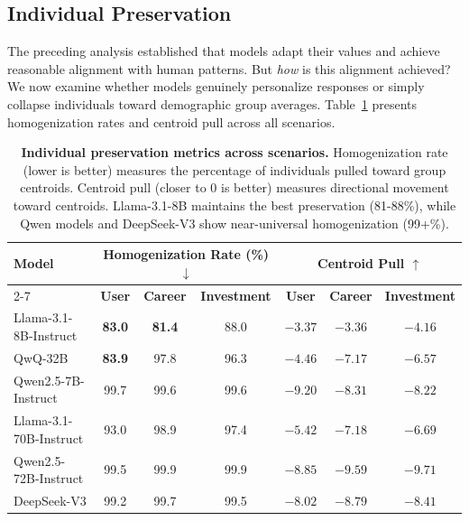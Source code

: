 \documentclass[11pt,a4paper]{article}
\begin{document}
\subsection{Individual Preservation}
\label{sec:individual_preservation_analysis}

The preceding analysis established that models adapt their values and achieve reasonable alignment with human patterns. But \textit{how} is this alignment achieved? We now examine whether models genuinely personalize responses or simply collapse individuals toward demographic group averages. Table~\ref{tab:preservation_cross_format} presents homogenization rates and centroid pull across all scenarios.

\begin{table}[t]
\centering
\small
\begin{tabular}{l|ccc|ccc}
    \toprule
    \multirow{2}{*}{\textbf{Model}}
    & \multicolumn{3}{c|}{\textbf{Homogenization Rate (\%) $\downarrow$}}
    & \multicolumn{3}{c}{\textbf{Centroid Pull $\uparrow$}} \\
    \cmidrule{2-7}
    & \textbf{User} & \textbf{Career} & \textbf{Investment}
    & \textbf{User} & \textbf{Career} & \textbf{Investment} \\
    \midrule
    Llama-3.1-8B-Instruct  & \textbf{83.0} & \textbf{81.4} & 88.0 & $-3.37$ & $-3.36$ & $-4.16$ \\
    QwQ-32B               & \textbf{83.9} & 97.8 & 96.3 & $-4.46$ & $-7.17$ & $-6.57$ \\
    Qwen2.5-7B-Instruct   & 99.7 & 99.6 & 99.6 & $-9.20$ & $-8.31$ & $-8.22$ \\
    Llama-3.1-70B-Instruct & 93.0 & 98.9 & 97.4 & $-5.42$ & $-7.18$ & $-6.69$ \\
    Qwen2.5-72B-Instruct  & 99.5 & 99.9 & 99.9 & $-8.85$ & $-9.59$ & $-9.71$ \\
    DeepSeek-V3           & 99.2 & 99.7 & 99.5 & $-8.02$ & $-8.79$ & $-8.41$ \\
    \bottomrule
\end{tabular}
\caption{
\textbf{Individual preservation metrics across scenarios.}
Homogenization rate (lower is better) measures the percentage of individuals pulled toward group centroids. Centroid pull (closer to 0 is better) measures directional movement toward centroids. Llama-3.1-8B maintains the best preservation (81-88\%), while Qwen models and DeepSeek-V3 show near-universal homogenization (99+\%).
}
\label{tab:preservation_cross_format}
\end{table}
\end{document}
